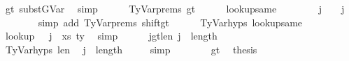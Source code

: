 \begin{isabellebody}
\ gt\ subst{\isacharunderscore}{\kern0pt}GVar\ \isamarkupfalse%
\ simp\isanewline
\isanewline
\ \ \ \ \isamarkupfalse%
\ TyVar{\isachardot}{\kern0pt}prems{\isacharparenleft}{\kern0pt}{}{\isacharparenright}{\kern0pt}\ gt\isanewline
\ \ \ \ \isamarkupfalse%
\ lookup{\isacharunderscore}{\kern0pt}same{\isacharcolon}{\kern0pt}\isanewline
\ \ \ \ \ \ {\isachardoublequoteopen}{\isasymGamma}\ {\isacharbang}{\kern0pt}\ j\ {\isacharequal}{\kern0pt}\ {\isasymGamma}{}\ {\isacharbang}{\kern0pt}\ j{\isachardoublequoteclose}\isanewline
\ \ \ \ \ \ \isamarkupfalse%
\ {\isacharparenleft}{\kern0pt}simp\ add{\isacharcolon}{\kern0pt}\ TyVar{\isachardot}{\kern0pt}prems{\isacharparenleft}{\kern0pt}{}{\isacharcomma}{\kern0pt}{}{\isacharparenright}{\kern0pt}\ shift{\isacharunderscore}{\kern0pt}gt{\isacharparenright}{\kern0pt}\isanewline
\isanewline
\ \ \ \ \isamarkupfalse%
\ TyVar{\isachardot}{\kern0pt}hyps{\isacharparenleft}{\kern0pt}{}{\isacharparenright}{\kern0pt}\ lookup{\isacharunderscore}{\kern0pt}same\isanewline
\ \ \ \ \isamarkupfalse%
\ lookup{}{\isacharcolon}{\kern0pt}\ {\isachardoublequoteopen}{\isasymGamma}{}\ {\isacharbang}{\kern0pt}\ j\ {\isacharequal}{\kern0pt}\ {\isacharparenleft}{\kern0pt}xs{\isacharprime}{\kern0pt}{\isacharcomma}{\kern0pt}\ ty{\isacharprime}{\kern0pt}{\isacharparenright}{\kern0pt}{\isachardoublequoteclose}\ \isamarkupfalse%
\ simp\isanewline
\isanewline
\ \ \ \ \isamarkupfalse%
\ j{\isacharunderscore}{\kern0pt}gt{\isacharunderscore}{\kern0pt}len{\isacharunderscore}{\kern0pt}{\isasymGamma}{}{\isacharcolon}{\kern0pt}\ {\isachardoublequoteopen}j\ {\isacharless}{\kern0pt}\ length\ {\isasymGamma}{}{\isachardoublequoteclose}\isanewline
\ \ \ \ \isamarkupfalse%
\ {\isacharminus}{\kern0pt}\isanewline
\ \ \ \ \ \ \isamarkupfalse%
\ TyVar{\isachardot}{\kern0pt}hyps{\isacharparenleft}{\kern0pt}{}{\isacharparenright}{\kern0pt}\ len{\isacharunderscore}{\kern0pt}{\isasymGamma}{}\ \isamarkupfalse%
\ {\isachardoublequoteopen}j\ {\isacharless}{\kern0pt}\ length\ {\isasymGamma}{}\ {\isacharplus}{\kern0pt}\ {}{\isachardoublequoteclose}\ \isamarkupfalse%
\ simp\isanewline
\ \ \ \ \ \ \isamarkupfalse%
\ gt\ \isamarkupfalse%
\ {\isacharquery}{\kern0pt}thesis\isanewline

\end{isabellebody}
